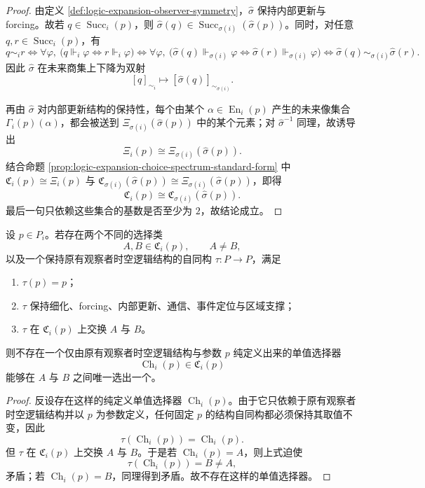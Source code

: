\begin{proof}
由定义 \ref{def:logic-expansion-observer-symmetry}，\(\widehat{\sigma}\) 保持内部更新与 forcing。故若 \(q\in \operatorname{Succ}_i(p)\)，则 \(\widehat{\sigma}(q)\in \operatorname{Succ}_{\sigma(i)}(\widehat{\sigma}(p))\)。同时，对任意 \(q,r\in \operatorname{Succ}_i(p)\)，有
\[
q\sim_i r
\iff
\forall \varphi,\ \bigl(q\Vdash_i\varphi \iff r\Vdash_i\varphi\bigr)
\iff
\forall \varphi,\ \bigl(\widehat{\sigma}(q)\Vdash_{\sigma(i)}\varphi \iff \widehat{\sigma}(r)\Vdash_{\sigma(i)}\varphi\bigr)
\iff
\widehat{\sigma}(q)\sim_{\sigma(i)}\widehat{\sigma}(r).
\]
因此 \(\widehat{\sigma}\) 在未来商集上下降为双射
\[
[q]_{\sim_i}\longmapsto [\widehat{\sigma}(q)]_{\sim_{\sigma(i)}}.
\]

再由 \(\widehat{\sigma}\) 对内部更新结构的保持性，每个由某个 \(\alpha\in \operatorname{En}_i(p)\) 产生的未来像集合 \(\Gamma_i(p)(\alpha)\)，都会被送到 \(\Xi_{\sigma(i)}(\widehat{\sigma}(p))\) 中的某个元素；对 \(\widehat{\sigma}^{-1}\) 同理，故诱导出
\[
\Xi_i(p)\cong \Xi_{\sigma(i)}(\widehat{\sigma}(p)).
\]
结合命题 \ref{prop:logic-expansion-choice-spectrum-standard-form} 中 \(\mathfrak C_i(p)\cong \Xi_i(p)\) 与 \(\mathfrak C_{\sigma(i)}(\widehat{\sigma}(p))\cong \Xi_{\sigma(i)}(\widehat{\sigma}(p))\)，即得
\[
\mathfrak C_i(p)\cong \mathfrak C_{\sigma(i)}(\widehat{\sigma}(p)).
\]
最后一句只依赖这些集合的基数是否至少为 \(2\)，故结论成立。
\end{proof}

\begin{theorem}[局部对称下单值选择器的定义障碍]\label{thm:logic-expansion-choice-spectrum-no-definable-selector}
设 \(p\in P_i\)。若存在两个不同的选择类
\[
A,B\in \mathfrak C_i(p),
\qquad
A\neq B,
\]
以及一个保持原有观察者时空逻辑结构的自同构 \(\tau:P\to P\)，满足
\begin{enumerate}
  \item \(\tau(p)=p\)；
  \item \(\tau\) 保持细化、forcing、内部更新、通信、事件定位与区域支撑；
  \item \(\tau\) 在 \(\mathfrak C_i(p)\) 上交换 \(A\) 与 \(B\)。
\end{enumerate}
则不存在一个仅由原有观察者时空逻辑结构与参数 \(p\) 纯定义出来的单值选择器
\[
\operatorname{Ch}_i(p)\in \mathfrak C_i(p)
\]
能够在 \(A\) 与 \(B\) 之间唯一选出一个。
\end{theorem}

\begin{proof}
反设存在这样的纯定义单值选择器 \(\operatorname{Ch}_i(p)\)。由于它只依赖于原有观察者时空逻辑结构并以 \(p\) 为参数定义，任何固定 \(p\) 的结构自同构都必须保持其取值不变，因此
\[
\tau(\operatorname{Ch}_i(p))=\operatorname{Ch}_i(p).
\]
但 \(\tau\) 在 \(\mathfrak C_i(p)\) 上交换 \(A\) 与 \(B\)。于是若 \(\operatorname{Ch}_i(p)=A\)，则上式迫使
\[
\tau(\operatorname{Ch}_i(p))=B\neq A,
\]
矛盾；若 \(\operatorname{Ch}_i(p)=B\)，同理得到矛盾。故不存在这样的单值选择器。
\end{proof}

